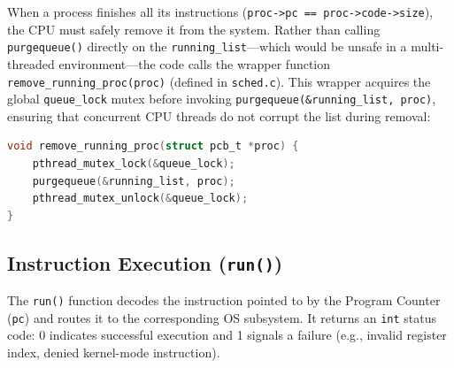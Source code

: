 \begin{theorybox}
When a process finishes all its instructions (\texttt{proc->pc == proc->code->size}), the CPU must safely remove it from the system. Rather than calling \texttt{purgequeue()} directly on the \texttt{running\_list}---which would be unsafe in a multi-threaded environment---the code calls the wrapper function \texttt{remove\_running\_proc(proc)} (defined in \texttt{sched.c}). This wrapper acquires the global \texttt{queue\_lock} mutex before invoking \texttt{purgequeue(\&running\_list, proc)}, ensuring that concurrent CPU threads do not corrupt the list during removal:
\begin{lstlisting}[language=C, caption=Thread-safe process removal (\texttt{sched.c})]
void remove_running_proc(struct pcb_t *proc) {
    pthread_mutex_lock(&queue_lock);
    purgequeue(&running_list, proc);
    pthread_mutex_unlock(&queue_lock);
}
\end{lstlisting}
\end{theorybox}

\subsection{Instruction Execution (\texttt{run()})}
The \texttt{run()} function decodes the instruction pointed to by the Program Counter (\texttt{pc}) and routes it to the corresponding OS subsystem. It returns an \texttt{int} status code: 0 indicates successful execution and 1 signals a failure (e.g., invalid register index, denied kernel-mode instruction).

